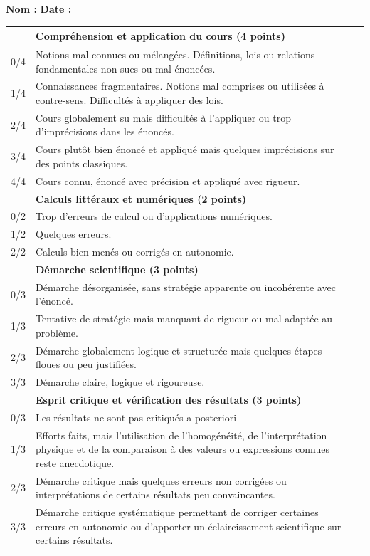 \documentclass[a4paper,12pt,french]{article}
\newcommand{\e}[1]{\vspace{5mm}\noindent \textbf{\underline{#1}}}
\begin{document}
\begin{scriptsize}
	
\e{Nom :} \hfill \e{Date :} \hspace{3cm}

\begin{center}
\begin{tabular}{|p{}|p{}|p{}|}
	\hline
	& \textbf{Compréhension et application du cours (4 points)} & \\ \hline
	0/4 & Notions mal connues ou mélangées. Définitions, lois ou relations fondamentales non sues ou mal énoncées. & \\ \hline
	1/4 & Connaissances fragmentaires. Notions mal comprises ou utilisées à contre-sens. Difficultés à appliquer des lois. & \\ \hline
	2/4 & Cours globalement su mais difficultés à l'appliquer ou trop d'imprécisions dans les énoncés. & \\ \hline
	3/4 & Cours plutôt bien énoncé et appliqué mais quelques imprécisions sur des points classiques. & \\ \hline
	4/4 & Cours connu, énoncé avec précision et appliqué avec rigueur. & \\ \hline
	
	& \textbf{Calculs littéraux et numériques (2 points)} & \\ \hline
	0/2 & Trop d'erreurs de calcul ou d'applications numériques. & \\ \hline
	1/2 & Quelques erreurs. & \\ \hline
	2/2 & Calculs bien menés ou corrigés en autonomie. & \\ \hline
	
	& \textbf{Démarche scientifique (3 points)} & \\ \hline
	0/3 & Démarche désorganisée, sans stratégie apparente ou incohérente avec l'énoncé. & \\ \hline
	1/3 & Tentative de stratégie mais manquant de rigueur ou mal adaptée au problème. & \\ \hline
	2/3 & Démarche globalement logique et structurée mais quelques étapes floues ou peu justifiées. & \\ \hline
	3/3 & Démarche claire, logique et rigoureuse. & \\ \hline
	
	& \textbf{Esprit critique et vérification des résultats (3 points)} & \\ \hline
	0/3 & Les résultats ne sont pas critiqués a posteriori & \\ \hline
	1/3 & Efforts faits, mais l'utilisation de l'homogénéité, de l'interprétation physique et de la comparaison à des valeurs ou expressions connues reste anecdotique. & \\ \hline
	2/3 & Démarche critique mais quelques erreurs non corrigées ou interprétations de certains résultats peu convaincantes. & \\ \hline
	3/3 & Démarche critique systématique permettant de corriger certaines erreurs en autonomie ou d'apporter un éclaircissement scientifique sur certains résultats. & \\ \hline
	

\end{tabular}
\end{center}
\end{scriptsize}
\end{document}
